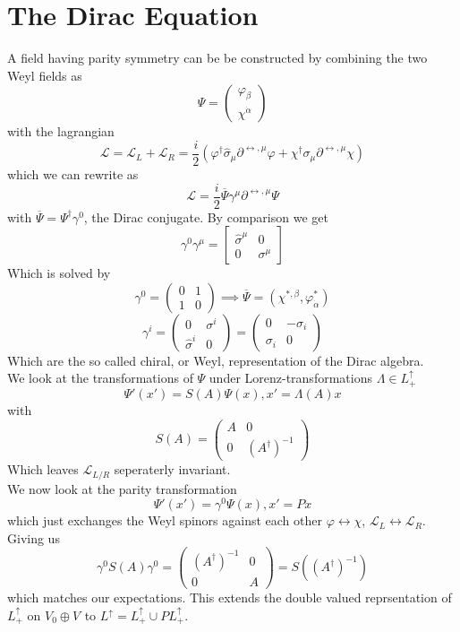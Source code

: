 \documentclass{report}
\begin{document}
\section{The Dirac Equation}
A field having parity symmetry can be be constructed by combining the two Weyl fields as \[
\Psi = \begin{pmatrix} \varphi_\beta  \\ \chi^{\dot{\alpha}}   \end{pmatrix} 
\] with the lagrangian \[
\mathcal{L} = \mathcal{L} _L + \mathcal{L} _R = \frac{i}{2} \left( \varphi^\dagger \hat{\sigma}_\mu \partial^{\leftrightarrow, \mu} \varphi + \chi^\dagger \sigma_\mu \partial^{\leftrightarrow, \mu}  \chi  \right) 
\] which we can rewrite as \[
\mathcal{L} = \frac{i}{2} \overline{\Psi} \gamma^{\mu} \partial^{\leftrightarrow, \mu} \Psi 
\] 
with $\overline{\Psi} = \Psi^\dagger \gamma^{0} $, the Dirac conjugate. By comparison we get \[
  \gamma^{0} \gamma^{\mu} = \begin{bmatrix} \hat{\sigma}^{\mu} & 0  \\ 0 & \sigma^{\mu} \end{bmatrix} 
\] Which is solved by 
\[
  \gamma^{0} = \begin{pmatrix} 0 & 1  \\ 1 & 0 \end{pmatrix} \implies \overline{\Psi} = \left( \chi^{*,\beta} , \varphi^{*}_{\dot{\alpha}} \right) 
\] \[
  \gamma^{i} = \begin{pmatrix} 0 & \sigma^{i} \\ \hat{\sigma}^{i} & 0 \end{pmatrix} = \begin{pmatrix} 0 & -\sigma_i \\ \sigma_i & 0 \end{pmatrix} 
\] 
Which are the so called chiral, or Weyl, representation of the Dirac algebra.\\
We look at the transformations of $\Psi$ under Lorenz-transformations $\Lambda \in L_+^{\uparrow} $ \[
\Psi'\left( x' \right) = S\left( A \right) \Psi\left( x \right) , x' = \Lambda\left( A \right) x
\] with \[
S\left( A \right) = \begin{pmatrix} A & 0 \\ 0 & \left( A^\dagger \right)^{-1}  \end{pmatrix} 
\] Which leaves $\mathcal{L}_{L / R} $ seperaterly invariant. \\
We now look at the parity transformation \[
\Psi'\left( x' \right) = \gamma^{0} \Psi\left( x \right) , x' = Px
\] which just exchanges the Weyl spinors against each other $\varphi \leftrightarrow \chi$, $\mathcal{L}_L \leftrightarrow \mathcal{L}_R$. Giving us \[
\gamma^{0} S\left( A \right) \gamma^{0} = \begin{pmatrix} \left( A^\dagger  \right)^{-1} & 0 \\ 0 & A \end{pmatrix} = S\left( \left( A^\dagger \right) ^{-1}  \right)  
\] which matches our expectations. This extends the double valued reprsentation of $L_+^{\uparrow} $ on $V_0 \oplus V^{\dot{ } } $ to $L^{\uparrow} = L_+^{\uparrow} \cup P L_+^{\uparrow} $.\\
\end{document}
